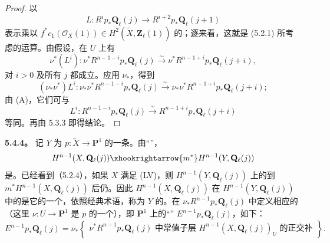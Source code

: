 \begin{proof}
以
\[L:R^ip_*\mathbf Q_\ell(j)\longrightarrow R^{i+2}p_*\mathbf Q_\ell(j+1)\]
表示乘以 $f^*c_1(\mathscr O_X(1))\in H^2(\widetilde X,\mathbf Z_\ell(1))$ 的；逐来看，这就是 (5.2.1) 所考虑的运算。由假设，在 $U$ 上有
\begin{equation}\tag{5.4.1}\nu^*(L^i):\nu^*R^{n-1-i}p_*\mathbf Q_\ell(j)\xrightarrow{\sim}\nu^*R^{n-1+i}p_*\mathbf Q_\ell(j+i),\end{equation}
对 $i>0$ 及所有 $j$ 都成立。应用 $\nu_*$，得到
\begin{equation}\tag{5.4.2}(\nu_*\nu^*)L^i:\nu_*\nu^*R^{n-1-i}p_*\mathbf Q_\ell(j)\xrightarrow{\sim}\nu_*\nu^*R^{n-1+i}p_*\mathbf Q_\ell(j+i);\end{equation}
由 (A)，它们可与
\begin{equation}\tag{5.4.3}L^i:R^{n-1-i}p_*\mathbf Q_\ell(j)\xrightarrow{\sim}R^{n-1+i}p_*\mathbf Q_\ell(j+i)\end{equation}
等同。再由 5.3.3 即得结论。
\end{proof}
\textbf{5.4.4。} 记 $Y$ 为 $p:\widetilde X\to\mathbf P^1$ 的一条。由“”，
\[H^{n-1}(X,\mathbf Q_\ell(j))\xhookrightarrow{m^*}H^{n-1}(Y,\mathbf Q_\ell(j))\]
是。已经看到（5.2.4），如果 $X$ 满足 (LV)，则 $H^{n-1}(Y,\mathbf Q_\ell(j))$ 上的到 $m^*H^{n-1}(X,\mathbf Q_\ell(j))$ 后仍。因此 $H^{n-1}(X,\mathbf Q_\ell(j))$ 在 $H^{n-1}(Y,\mathbf Q_\ell(j))$ 中的是它的一个，依照经典术语，称为 $Y$ 的。在 $\nu_*R^{n-1}p_*\mathbf Q_\ell(j)$ 中定义相应的（这里 $\nu:U\to\mathbf P^1$ 是 $p$ 的一个），即 $\mathbf P^1$ 上的“” $E^{n-1}p_*\mathbf Q_\ell(j)$，如下：
\begin{equation}\tag{5.4.4.1}E^{n-1}p_*\mathbf Q_\ell(j)=\nu_*\left\{\begin{gathered}\nu^*R^{n-1}p_*\mathbf Q_\ell(j)\text{ 中}\text{常值子层 }H^{n-1}(X,\mathbf Q_\ell(j))_U\text{ 的正交补}\end{gathered}\right\}.\end{equation}
